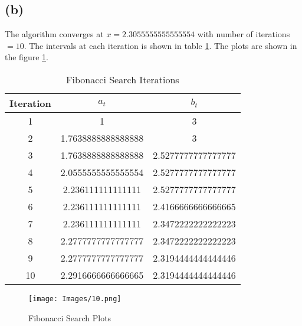 \documentclass{article}
\begin{document}
\subsection*{(b)}

The algorithm converges at $x = 2.3055555555555554$ with number of iterations $= 10$. The intervals at each iteration is shown in table \ref{tab:fibonacci-search}. The plots are shown in the figure \ref{fig:fibonacci-search}.

\begin{table}
    \centering
    \begin{tabular}{|c|c|c|}
    \hline
    Iteration & $a_t$ & $b_t$ \\
    \hline
    1 & 1 & 3 \\
    2 & 1.7638888888888888 & 3 \\
    3 & 1.7638888888888888 & 2.5277777777777777 \\
    4 & 2.0555555555555554 & 2.5277777777777777 \\
    5 & 2.236111111111111 & 2.5277777777777777 \\
    6 & 2.236111111111111 & 2.4166666666666665 \\
    7 & 2.236111111111111 & 2.3472222222222223 \\
    8 & 2.2777777777777777 & 2.3472222222222223 \\
    9 & 2.2777777777777777 & 2.3194444444444446 \\
    10 & 2.2916666666666665 & 2.3194444444444446 \\
    \hline
    \end{tabular}
    \caption{Fibonacci Search Iterations}
    \label{tab:fibonacci-search}
\end{table}

\begin{figure}
    \centering
    \texttt{[image: Images/10.png]}
    \caption{Fibonacci Search Plots}
    \label{fig:fibonacci-search}
\end{figure}
\end{document}
